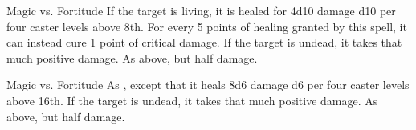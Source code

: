 \begin{spellheader}
    \spellrng{\rngclose}
\end{spellheader}
\begin{spelleffects}
    \begin{spellattack}{Magic vs. Fortitude}
        \spelleffect If the target is living, it is healed for 4d10 damage \add d10 per four caster levels above 8th. For every 5 points of healing granted by this spell, it can instead cure 1 point of critical damage.
        \spellsuccess If the target is undead, it takes that much positive damage.
        \spellfailure As above, but half damage.
    \end{spellattack}
\end{spelleffects}
\begin{spellfooter}

\end{spellfooter}

\begin{spellheader}
    \spellrng{\rngclose}
\end{spellheader}
\begin{spelleffects}
    \begin{spellattack}{Magic vs. Fortitude}
        \spelleffect As , except that it heals 8d6 damage \add d6 per four caster levels above 16th.
        \spellsuccess If the target is undead, it takes that much positive damage.
        \spellfailure As above, but half damage.
    \end{spellattack}
\end{spelleffects}
\begin{spellfooter}

\end{spellfooter}

